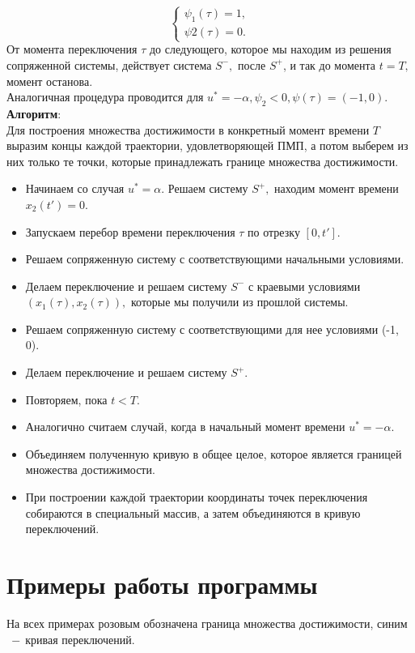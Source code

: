\documentclass{article}
\begin{document}
$$
\begin{cases}
    \psi_1(\tau) = 1,\\
    \psi2(\tau)=0.
\end{cases}
$$
От момента переключения $\tau$ до следующего, которое мы находим из решения сопряженной системы, действует система $S^-,$ после $S^+$, и так до момента $t=T,$ момент останова.\\
Аналогичная процедура проводится для $u^* = -\alpha, \psi_2 < 0, \psi(\tau) = (-1, 0).$\\
\textbf{Алгоритм}:\\
Для построения множества достижимости в конкретный момент времени $T$ выразим концы каждой траектории, удовлетворяющей ПМП, а потом выберем из них только те точки, которые принадлежать границе множества достижимости.
\begin{itemize}
    \item [1.] Начинаем со случая $u^*= \alpha.$ Решаем систему $S^+,$ находим момент времени $x_2(t') = 0.$
    \item [2.] Запускаем перебор времени переключения $\tau$ по отрезку $[0, t'].$
    \item [3.] Решаем сопряженную систему с соответствующими начальными условиями.
    \item [4.] Делаем переключение и решаем систему $S^-$ с краевыми условиями $(x_1(\tau), x_2(\tau)),$ которые мы получили из прошлой системы.
    \item[5.] Решаем сопряженную систему с соответствующими для нее условиями (-1, 0).
    \item [6.] Делаем переключение и решаем систему $S^+.$
    \item [7.] Повторяем, пока $t < T.$
    \item [8.] Аналогично считаем случай, когда в начальный момент времени $u^*= -\alpha.$
    \item [9.] Объединяем полученную кривую в общее целое, которое является границей множества достижимости.
    \item [10.] При построении каждой траектории координаты точек переключения собираются в специальный массив, а затем объединяются в кривую переключений. 
\end{itemize}

\newpage
\section{Примеры работы программы}
На всех примерах розовым обозначена граница множества достижимости, синим$~-~$кривая переключений.
\end{document}
